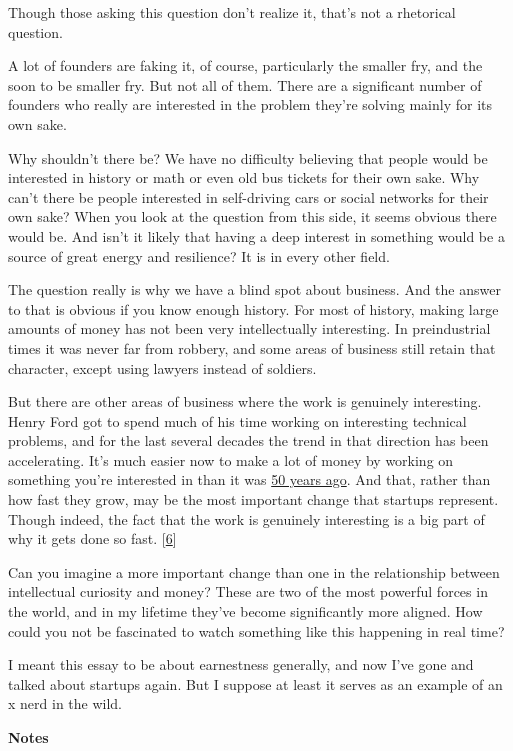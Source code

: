 Though those asking this question don't realize it, that's not a
rhetorical question.

A lot of founders are faking it, of course, particularly the smaller
fry, and the soon to be smaller fry. But not all of them. There are a
significant number of founders who really are interested in the problem
they're solving mainly for its own sake.

Why shouldn't there be? We have no difficulty believing that people
would be interested in history or math or even old bus tickets for their
own sake. Why can't there be people interested in self-driving cars or
social networks for their own sake? When you look at the question from
this side, it seems obvious there would be. And isn't it likely that
having a deep interest in something would be a source of great energy
and resilience? It is in every other field.

The question really is why we have a blind spot about business. And the
answer to that is obvious if you know enough history. For most of
history, making large amounts of money has not been very intellectually
interesting. In preindustrial times it was never far from robbery, and
some areas of business still retain that character, except using lawyers
instead of soldiers.

But there are other areas of business where the work is genuinely
interesting. Henry Ford got to spend much of his time working on
interesting technical problems, and for the last several decades the
trend in that direction has been accelerating. It's much easier now to
make a lot of money by working on something you're interested in than it
was \href{re.html}{50 years ago}. And that, rather than how fast they
grow, may be the most important change that startups represent. Though
indeed, the fact that the work is genuinely interesting is a big part of
why it gets done so fast. {[}\hyperref[f6n]{6}{]}

Can you imagine a more important change than one in the relationship
between intellectual curiosity and money? These are two of the most
powerful forces in the world, and in my lifetime they've become
significantly more aligned. How could you not be fascinated to watch
something like this happening in real time?

I meant this essay to be about earnestness generally, and now I've gone
and talked about startups again. But I suppose at least it serves as an
example of an x nerd in the wild.

\textbf{Notes}

